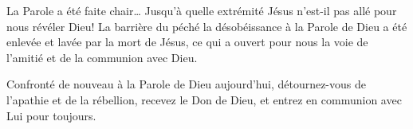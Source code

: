 \og La Parole a été faite chair… \fg{} Jusqu'à quelle extrémité Jésus n'est-il pas allé pour nous révéler Dieu! La barrière du péché \ocadr la désobéissance à la Parole de Dieu \fcadr{} a été enlevée et lavée par la mort de Jésus, ce qui a ouvert pour nous la voie de l'amitié et de la communion avec Dieu.

Confronté de nouveau à la Parole de Dieu aujourd'hui, détournez-vous de l'apathie et de la rébellion, recevez le Don de Dieu, et entrez en communion avec Lui pour toujours.

\enlargethispage{5\baselineskip}



